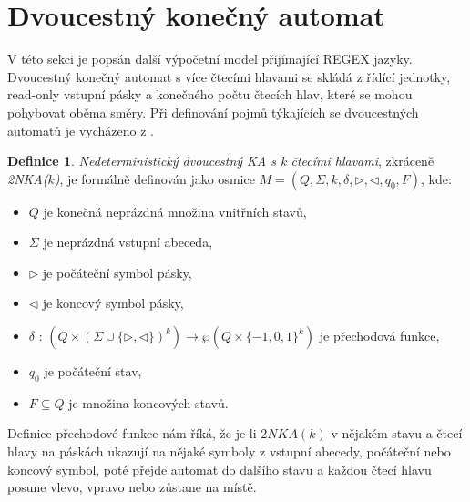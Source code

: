 \documentclass[thesis=B,czech]{FITthesis}[2019/12/23]
\theoremstyle{definition}
\newtheorem{definition}{Definice}[chapter]
\begin{document}
\section{Dvoucestný konečný automat}\label{sec:twoway}
V této sekci je popsán další výpočetní model přijímající REGEX jazyky. Dvoucestný konečný automat s více čtecími hlavami se skládá z řídící jednotky, read-only vstupní pásky a konečného počtu čtecích hlav, které se mohou pohybovat oběma směry. 
Při definování pojmů týkajících se dvoucestných automatů je vycházeno z \cite{holzer}.
\begin{definition}
\emph{Nedeterministický dvoucestný KA s k čtecími hlavami}, zkráceně \emph{2NKA($k$)}, je formálně definován jako osmice $M = \left(Q, \Sigma, k, \delta, \triangleright, \triangleleft, q_0, F\right)$, kde:
\begin{itemize}
	\item{$Q$ je konečná neprázdná množina vnitřních stavů,}
	\item{$\Sigma$ je neprázdná vstupní abeceda,}
	\item{$\triangleright$ je počáteční symbol pásky,}
	\item{$\triangleleft$ je koncový symbol pásky,}
	\item{$\delta$ : $\left(Q \times (\Sigma \cup \{\triangleright, \triangleleft \})^k\right) \rightarrow \wp\left( Q\times \{-1, 0, 1\}^k \right)$ je přechodová funkce,}
	\item{$q_0$ je počáteční stav,}
	\item{$F \subseteq Q$ je množina koncových stavů.}
\end{itemize}
\end{definition}

Definice přechodové funkce nám říká, že je-li $2NKA(k)$ v nějakém stavu a čtecí hlavy na páskách ukazují na nějaké symboly z vstupní abecedy, počáteční nebo koncový symbol, poté přejde automat do dalšího stavu a každou čtecí hlavu posune vlevo, vpravo nebo zůstane na místě.
\end{document}
